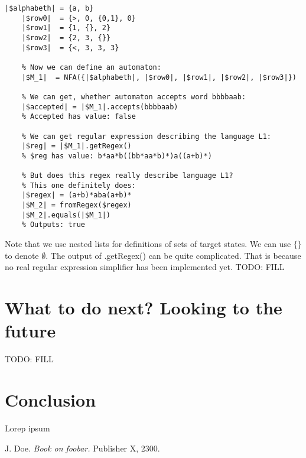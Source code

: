 \documentclass{ctuthesis}
\begin{document}
\begin{minipage}{\linewidth}
\begin{lstlisting}[language = JASL]
	|$alphabeth| = {a, b}
	|$row0|  = {>, 0, {0,1}, 0}
	|$row1|  = {1, {}, 2}
	|$row2|  = {2, 3, {}}
	|$row3|  = {<, 3, 3, 3}
    
	% Now we can define an automaton:
	|$M_1|  = NFA({|$alphabeth|, |$row0|, |$row1|, |$row2|, |$row3|})

	% We can get, whether automaton accepts word bbbbaab:
	|$accepted| = |$M_1|.accepts(bbbbaab)   
	% Accepted has value: false 
	
	% We can get regular expression describing the language L1:
	|$reg| = |$M_1|.getRegex()
	% $reg has value: b*aa*b((bb*aa*b)*)a((a+b)*) 

	% But does this regex really describe language L1? 
	% This one definitely does:
	|$regex| = (a+b)*aba(a+b)*
	|$M_2| = fromRegex($regex)
	|$M_2|.equals(|$M_1|) 	
	% Outputs: true
\end{lstlisting}
\end{minipage}

Note that we use nested lists for definitions of sets of target states. We can use $\{\}$ to denote $\emptyset$. The output of .getRegex() can be quite complicated. That is because no real regular expression simplifier has been implemented yet.
TODO: FILL

\chapter{What to do next? Looking to the future}
TODO: FILL


\chapter{Conclusion}
Lorep ipsum \cite{doe}

\begin{thebibliography}{1}
 J. Doe. \emph{Book on foobar.} Publisher X,
2300.
\end{thebibliography}
\end{document}
